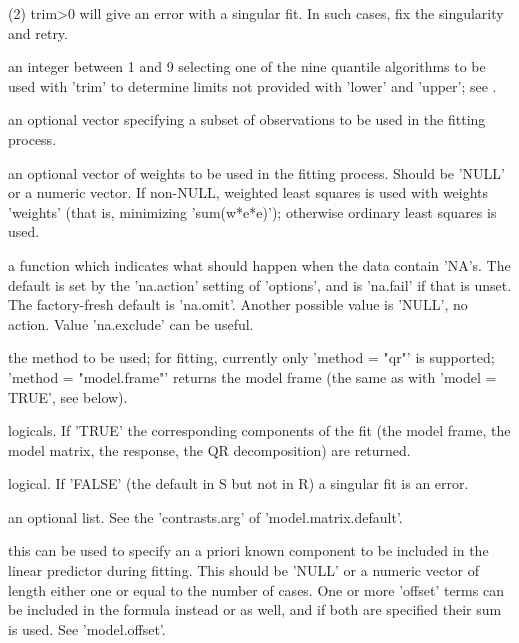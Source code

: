 \begin{Arguments}
\begin{ldescription}
(2) trim>0 will give an error with a singular fit.  In such cases,
fix the singularity and retry.  

\item[\code{quantileType}] an integer between 1 and 9 selecting one of the nine quantile
algorithms to be used with 'trim' to determine limits not provided
with 'lower' and 'upper';  see   .  

\item[\code{ subset }] an optional vector specifying a subset of observations to be used in
the fitting process. 

\item[\code{ weights }] an optional vector of weights to be used in the fitting process.
Should be 'NULL' or a numeric vector. If non-NULL, weighted least
squares is used with weights 'weights' (that is, minimizing
'sum(w*e*e)'); otherwise ordinary least squares is used.

\item[\code{ na.action }] a function which indicates what should happen when the data contain
'NA's.  The default is set by the 'na.action' setting of 'options',
and is 'na.fail' if that is unset.  The factory-fresh default is
'na.omit'.  Another possible value is 'NULL', no action.  Value
'na.exclude' can be useful. 

\item[\code{method}] the method to be used; for fitting, currently only 'method = "qr"'
is supported; 'method = "model.frame"' returns the model frame (the
same as with 'model = TRUE', see below). 

\item[\code{model, x, y, qr}] logicals.  If 'TRUE' the corresponding components of the fit (the
model frame, the model matrix, the response, the QR decomposition)
are returned. 

\item[\code{ singular.ok }] logical. If 'FALSE' (the default in S but not in R) a singular fit
is an error.

\item[\code{ contrasts }] an optional list. See the 'contrasts.arg' of
'model.matrix.default'. 

\item[\code{offset}] this can be used to specify an a priori known component to be
included in the linear predictor during fitting.  This should be
'NULL' or a numeric vector of length either one or equal to the
number of cases. One or more 'offset' terms can be included in the
formula instead or as well, and if both are specified their sum is
used.  See 'model.offset'. 


\end{ldescription}
\end{Arguments}
